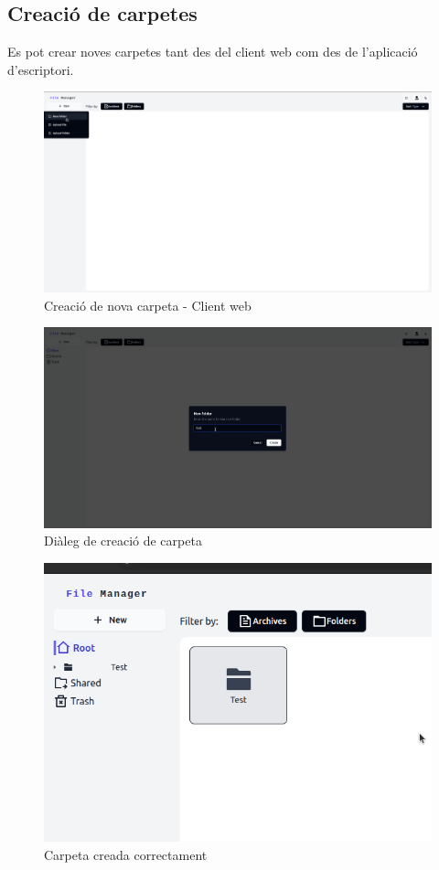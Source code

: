 \subsection{Creació de carpetes}

Es pot crear noves carpetes tant des del client web com des de l'aplicació d'escriptori.

\begin{figure}[H]
\centering
\includegraphics[width=0.7\linewidth]{Figures/implementacio/newFolder.png}
\caption{Creació de nova carpeta - Client web}
\label{fig:newFolder}
\end{figure}

\begin{figure}[H]
\centering
\includegraphics[width=0.7\linewidth]{Figures/implementacio/newFolderModal.png}
\caption{Diàleg de creació de carpeta}
\label{fig:newFolderModal}
\end{figure}

\begin{figure}[H]
\centering
\includegraphics[width=0.7\linewidth]{Figures/implementacio/newFolderCreated.png}
\caption{Carpeta creada correctament}
\label{fig:newFolderCreated}
\end{figure}

